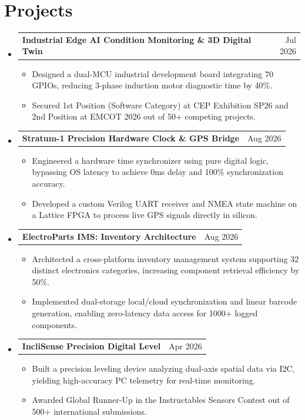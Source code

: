 \documentclass[letterpaper,10pt]{article}
\makeatletter
\newcommand{\resumeItem}[1]{\item\small{#1 \vspace{-2pt}}}
\newcommand{\resumeProjectHeading}[2]{
  \vspace{-1pt}\item
    \begin{tabular*}{0.97\textwidth}[t]{l@{\extracolsep{\fill}}r}
      \textbf{#1} & #2 \\
    \end{tabular*}\vspace{-5pt}
}
\makeatother
\begin{document}
\section{Projects}
  \begin{itemize}[leftmargin=0.15in, label={}]
    
    \resumeProjectHeading
      {Industrial Edge AI Condition Monitoring \& 3D Digital Twin}{Jul 2026}
      \begin{itemize}[leftmargin=0.15in, label=\textbullet]
        \resumeItem{Designed a dual-MCU industrial development board integrating 70 GPIOs, reducing 3-phase induction motor diagnostic time by 40\%.}
        \resumeItem{Secured 1st Position (Software Category) at CEP Exhibition SP26 and 2nd Position at EMCOT 2026 out of 50+ competing projects.}
      \end{itemize}

    \resumeProjectHeading
      {Stratum-1 Precision Hardware Clock \& GPS Bridge}{Aug 2026}
      \begin{itemize}[leftmargin=0.15in, label=\textbullet]
        \resumeItem{Engineered a hardware time synchronizer using pure digital logic, bypassing OS latency to achieve 0ms delay and 100\% synchronization accuracy.}
        \resumeItem{Developed a custom Verilog UART receiver and NMEA state machine on a Lattice FPGA to process live GPS signals directly in silicon.}
      \end{itemize}

    \resumeProjectHeading
      {ElectroParts IMS: Inventory Architecture}{Aug 2026}
      \begin{itemize}[leftmargin=0.15in, label=\textbullet]
        \resumeItem{Architected a cross-platform inventory management system supporting 32 distinct electronics categories, increasing component retrieval efficiency by 50\%.}
        \resumeItem{Implemented dual-storage local/cloud synchronization and linear barcode generation, enabling zero-latency data access for 1000+ logged components.}
      \end{itemize}

    \resumeProjectHeading
      {IncliSense Precision Digital Level}{Apr 2026}
      \begin{itemize}[leftmargin=0.15in, label=\textbullet]
        \resumeItem{Built a precision leveling device analyzing dual-axis spatial data via I2C, yielding high-accuracy PC telemetry for real-time monitoring.}
        \resumeItem{Awarded Global Runner-Up in the Instructables Sensors Contest out of 500+ international submissions.}
      \end{itemize}

  \end{itemize}
\end{document}
